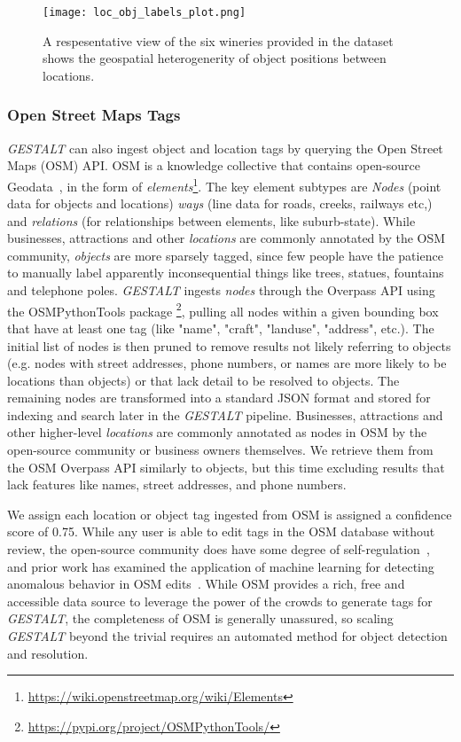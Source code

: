 \begin{figure*}[ht]
    \texttt{[image: loc\_obj\_labels\_plot.png]}
    \centering
    \caption[width=\textwidth]{A respesentative view of the six wineries provided in the dataset shows the geospatial heterogenerity of object positions between locations.}
    \label{fig:loc-obj}  
\end{figure*}


\subsubsection{Open Street Maps Tags}
\emph{GESTALT} can also ingest object and location tags by querying the Open Street Maps (OSM) API.
OSM is a knowledge collective that contains open-source Geodata~\cite{Haklay2008}, in the form of  \textit{elements}\footnote{\href{https://wiki.openstreetmap.org/wiki/Elements}{https://wiki.openstreetmap.org/wiki/Elements}}. 
The key element subtypes are \textit{Nodes} (point data for objects and locations) \textit{ways} (line data for roads, creeks, railways etc,) and \textit{relations} (for relationships between elements, like suburb-state).
While businesses, attractions and other \textit{locations} are commonly annotated by the OSM community, \textit{objects} are more sparsely tagged, since few people have the patience to manually label apparently inconsequential things like trees, statues, fountains and telephone poles. 
\emph{GESTALT} ingests \textit{nodes} through the Overpass API using the OSMPythonTools package \footnote{\href{https://pypi.org/project/OSMPythonTools/}{https://pypi.org/project/OSMPythonTools/}}, pulling all nodes within a given bounding box that have at least one tag (like "name", "craft", "landuse", "address", etc.).
The initial list of nodes is then pruned to remove results not likely referring to objects (e.g. nodes with street addresses, phone numbers, or names are more likely to be locations than objects) or that lack detail to be resolved to objects.
The remaining nodes are transformed into a standard JSON format and stored for indexing and search later in the \emph{GESTALT} pipeline. 
Businesses, attractions and other higher-level \textit{locations} are commonly annotated as nodes in OSM by the open-source community or business owners themselves. 
We retrieve them from the OSM Overpass API similarly to objects, but this time excluding results that lack features like names, street addresses, and phone numbers. 

We assign each location or object tag ingested from OSM is assigned a confidence score of 0.75.
While any user is able to edit tags in the OSM database without review, the open-source community does have some degree of self-regulation~\cite{VargasMunoz2020}, and prior work has examined the application of machine learning for detecting anomalous behavior in OSM edits~\cite{Mooney2017}.
While OSM provides a rich, free and accessible data source to leverage the power of the crowds to generate tags for \emph{GESTALT}, the completeness of OSM is generally unassured, so scaling \textit{GESTALT} beyond the trivial requires an automated method for object detection and resolution. 

